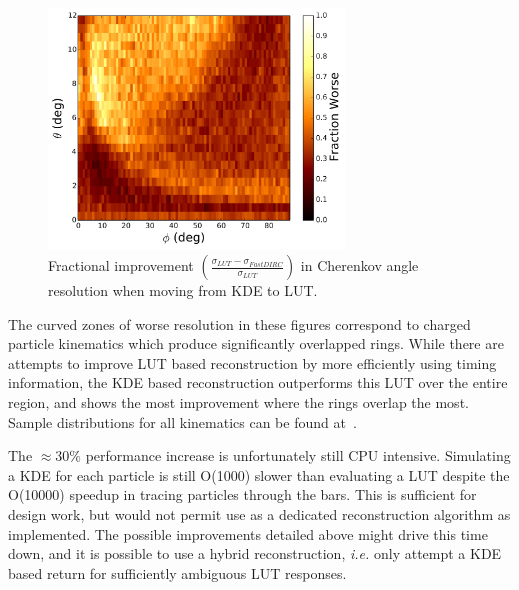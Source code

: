 \begin{figure}[!h]
\centering
\includegraphics[width=0.7\textwidth]{pics/lut_v_kde_map.pdf}
\caption{Fractional improvement $\left(\frac{\sigma_{LUT}-\sigma_{FastDIRC}}{\sigma_{LUT}}\right)$ in Cherenkov angle resolution when moving from KDE to LUT.}
\label{fig:FastDIRC_lut_comparison}
\end{figure}

The curved zones of worse resolution in these figures correspond to charged particle kinematics which produce significantly overlapped rings.  While there are attempts to improve LUT based reconstruction by more efficiently using timing information, the KDE based reconstruction outperforms this LUT over the entire region, and shows the most improvement where the rings overlap the most.  Sample distributions for all kinematics can be found at~\cite{hardinWebDists}.

The $\approx 30\%$ performance increase is unfortunately still CPU intensive.  Simulating a KDE for each particle is still O(1000) slower than evaluating a LUT despite the O(10000) speedup in tracing particles through the bars.  This is sufficient for design work, but would not permit use as a dedicated reconstruction algorithm as implemented.  The possible improvements detailed above might drive this time down, and it is possible to use a hybrid reconstruction, {\em i.e.} only attempt a KDE based return for sufficiently ambiguous LUT responses.

